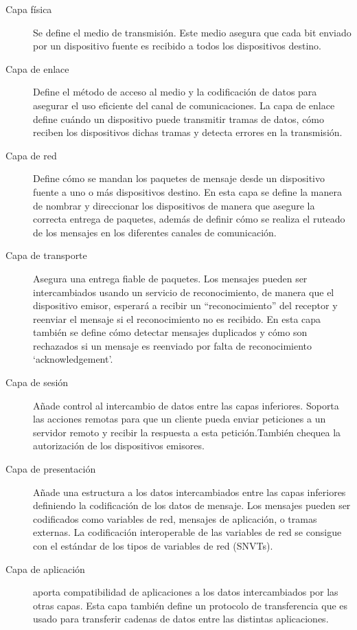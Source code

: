 \begin{description}
	\item[Capa física] Se define el medio de transmisión. Este medio asegura que cada bit enviado por un dispositivo fuente es recibido a todos los dispositivos destino.
	
    \item[Capa de enlace]Define el método de acceso al medio y la codificación de datos para asegurar el uso eficiente del canal de comunicaciones. La capa de enlace define cu\'ando un dispositivo puede transmitir tramas de datos, cómo reciben los dispositivos dichas tramas y detecta errores en la transmisión.
	
    \item[Capa de red]Define cómo se mandan los paquetes de mensaje desde un dispositivo fuente a uno o m\'as dispositivos destino. En esta capa se define la manera de nombrar y direccionar los dispositivos de manera que asegure la correcta entrega de paquetes, adem\'as de definir cómo se realiza el ruteado de los mensajes en los diferentes canales de comunicación.
	
    \item[Capa de transporte]Asegura una entrega fiable de paquetes. Los mensajes pueden ser intercambiados usando un servicio de reconocimiento, de manera que el dispositivo emisor, esperar\'a a recibir un “reconocimiento” del receptor y reenviar el mensaje si el reconocimiento no es recibido. En esta capa también se define cómo detectar mensajes duplicados y cómo son rechazados si un mensaje es reenviado por falta de reconocimiento ‘acknowledgement’.
    
	\item[Capa de sesión]Añade control al intercambio de datos entre las capas inferiores. Soporta las acciones remotas para que un cliente pueda enviar peticiones a un servidor remoto y recibir la respuesta a esta petición.También chequea la autorización de los dispositivos emisores. 
    	
    \item[Capa de presentación]Añade una estructura a los datos intercambiados entre las capas inferiores definiendo la codificación de los datos de mensaje. Los mensajes pueden ser codificados como variables de red, mensajes de aplicación, o tramas externas. La codificación interoperable de las variables de red se consigue con el est\'andar de los tipos de variables de red (SNVTs).
	
    \item[Capa de aplicación]aporta compatibilidad de aplicaciones a los datos intercambiados por las otras capas. Esta capa también define un protocolo de transferencia que es usado para transferir cadenas de datos entre las distintas aplicaciones.
\end{description}

